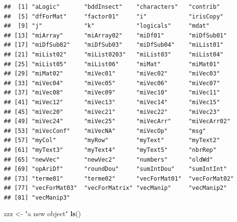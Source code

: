 \documentclass[]{book}
\newenvironment{Shaded}{\begin{snugshade}}{\end{snugshade}}
\newcommand{\KeywordTok}[1]{\textcolor[rgb]{0.13,0.29,0.53}{\textbf{#1}}}
\newcommand{\NormalTok}[1]{#1}
\newcommand{\StringTok}[1]{\textcolor[rgb]{0.31,0.60,0.02}{#1}}
\begin{document}
\begin{verbatim}
##  [1] "aLogic"       "bddInsect"    "characters"   "contrib"     
##  [5] "dfForMat"     "factor01"     "i"            "irisCopy"    
##  [9] "j"            "k"            "logicals"     "mdat"        
## [13] "miArray"      "miArray02"    "miDf01"       "miDfSub01"   
## [17] "miDfSub02"    "miDfSub03"    "miDfSub04"    "miList01"    
## [21] "miList02"     "miList0203"   "miList03"     "miList04"    
## [25] "miList05"     "miList06"     "miMat"        "miMat01"     
## [29] "miMat02"      "miVec01"      "miVec02"      "miVec03"     
## [33] "miVec04"      "miVec05"      "miVec06"      "miVec07"     
## [37] "miVec08"      "miVec09"      "miVec10"      "miVec11"     
## [41] "miVec12"      "miVec13"      "miVec14"      "miVec15"     
## [45] "miVec20"      "miVec21"      "miVec22"      "miVec23"     
## [49] "miVec24"      "miVec25"      "miVecArr"     "miVecArr02"  
## [53] "miVecConf"    "miVecNA"      "miVecOp"      "msg"         
## [57] "myCol"        "myRow"        "myText"       "myText2"     
## [61] "myText3"      "myText4"      "myText5"      "nbrRep"      
## [65] "newVec"       "newVec2"      "numbers"      "oldWd"       
## [69] "opAriDf"      "roundDou"     "sumIntDou"    "sumIntInt"   
## [73] "terme01"      "terme02"      "vecForMat01"  "vecForMat02" 
## [77] "vecForMat03"  "vecForMatrix" "vecManip"     "vecManip2"   
## [81] "vecManip3"
\end{verbatim}

\begin{Shaded}
\begin{Highlighting}[]
\NormalTok{zzz <-}\StringTok{ "a new object"}
\KeywordTok{ls}\NormalTok{()}
\end{Highlighting}
\end{Shaded}
\end{document}

